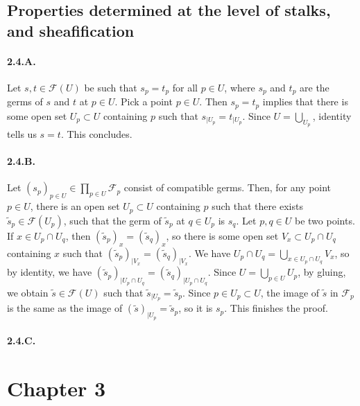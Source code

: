 \documentclass{article}
\newcommand{\Fsheaf}{\mathscr{F}}
\begin{document}
\subsection{Properties determined at the level of stalks, and sheafification}

\paragraph{2.4.A.} Let $s,t \in \Fsheaf(U)$ be such that $s_p = t_p$ for all $p \in U$, where $s_p$ and $t_p$ are the germs of $s$ and $t$ at $p \in U$. Pick a point $p \in U$. Then $s_p = t_p$ implies that there is some open set $U_p \subset U$ containing $p$ such that $s_{\mid U_p} = t_{\mid U_p}$. Since $U = \bigcup_{U_p}$, identity tells us $s = t$. This concludes.

\paragraph{2.4.B.} Let $(s_p)_{p \in U} \in \prod_{p \in U} \Fsheaf_p$ consist of compatible germs. Then, for any point $p \in U$, there is an open set $U_p \subset U$ containing $p$ such that there exists $\tilde{s}_p \in \Fsheaf(U_p)$, such that the germ of $\tilde{s}_p$ at $q \in U_p$ is $s_q$. Let $p,q \in U$ be two points. If $x \in U_p \cap U_q$, then $(\tilde{s}_p)_x = (\tilde{s}_q)_x$, so there is some open set $V_x \subset U_p \cap U_q$ containing $x$ such that $(\tilde{s}_p)_{\mid V_x} =(\tilde{s}_q)_{\mid V_x}$. We have $U_p \cap U_q = \bigcup_{x \in U_p \cap U_q} V_x$, so by identity, we have $(\tilde{s}_p)_{\mid U_p \cap U_q} = (\tilde{s}_q)_{\mid U_p \cap U_q}$. Since $U = \bigcup_{p \in U} U_p$, by gluing, we obtain $\tilde{s} \in \Fsheaf(U)$ such that $\tilde{s}_{\mid U_p} = \tilde{s}_p$. Since $p \in U_p \subset U$, the image of $\tilde{s}$ in $\Fsheaf_p$ is the same as the image of $(\tilde{s})_{\mid U_p} = \tilde{s}_p$, so it is $s_p$. This finishes the proof.

\paragraph{2.4.C.} 


\section*{Chapter 3}
\end{document}
